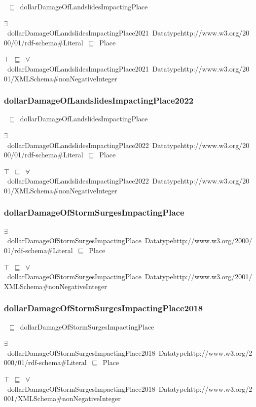\documentclass{article}
\begin{document}
~\ensuremath{\sqsubseteq}~dollarDamageOfLandslidesImpactingPlace

\ensuremath{\exists}~dollarDamageOfLandslidesImpactingPlace2021~Datatypehttp://www.w3.org/2000/01/rdf-schema#Literal~\ensuremath{\sqsubseteq}~Place

\ensuremath{\top}~\ensuremath{\sqsubseteq}~\ensuremath{\forall}~dollarDamageOfLandslidesImpactingPlace2021~Datatypehttp://www.w3.org/2001/XMLSchema#nonNegativeInteger

\subsubsection*{dollarDamageOfLandslidesImpactingPlace2022}

~\ensuremath{\sqsubseteq}~dollarDamageOfLandslidesImpactingPlace

\ensuremath{\exists}~dollarDamageOfLandslidesImpactingPlace2022~Datatypehttp://www.w3.org/2000/01/rdf-schema#Literal~\ensuremath{\sqsubseteq}~Place

\ensuremath{\top}~\ensuremath{\sqsubseteq}~\ensuremath{\forall}~dollarDamageOfLandslidesImpactingPlace2022~Datatypehttp://www.w3.org/2001/XMLSchema#nonNegativeInteger

\subsubsection*{dollarDamageOfStormSurgesImpactingPlace}

\ensuremath{\exists}~dollarDamageOfStormSurgesImpactingPlace~Datatypehttp://www.w3.org/2000/01/rdf-schema#Literal~\ensuremath{\sqsubseteq}~Place

\ensuremath{\top}~\ensuremath{\sqsubseteq}~\ensuremath{\forall}~dollarDamageOfStormSurgesImpactingPlace~Datatypehttp://www.w3.org/2001/XMLSchema#nonNegativeInteger

\subsubsection*{dollarDamageOfStormSurgesImpactingPlace2018}

~\ensuremath{\sqsubseteq}~dollarDamageOfStormSurgesImpactingPlace

\ensuremath{\exists}~dollarDamageOfStormSurgesImpactingPlace2018~Datatypehttp://www.w3.org/2000/01/rdf-schema#Literal~\ensuremath{\sqsubseteq}~Place

\ensuremath{\top}~\ensuremath{\sqsubseteq}~\ensuremath{\forall}~dollarDamageOfStormSurgesImpactingPlace2018~Datatypehttp://www.w3.org/2001/XMLSchema#nonNegativeInteger
\end{document}
